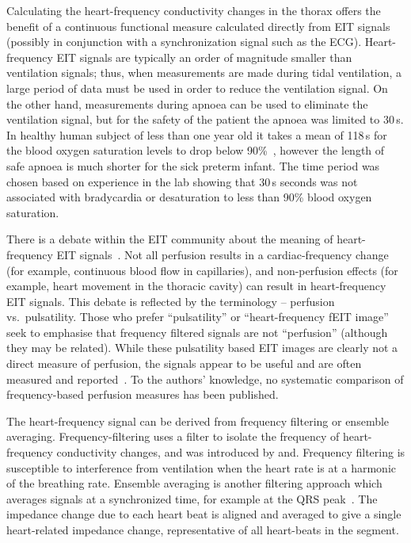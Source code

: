 Calculating the heart-frequency conductivity 
changes in the thorax offers the benefit of a continuous functional
measure calculated directly from EIT signals (possibly
in conjunction with a synchronization signal such as the ECG).
Heart-frequency EIT signals are typically an order of magnitude smaller than
ventilation signals; thus, when measurements are made during
tidal ventilation, a large period of data must be used
in order to reduce the ventilation signal. On the other hand,
measurements during apnoea can be used to eliminate the ventilation signal,
but for the safety of the patient the apnoea was limited to 30\,s.
In healthy human subject of less than one year old it 
takes a mean of 118\,s 
for the blood oxygen saturation levels to drop below
90\%~\parencite{Xue1996}, however
the length of safe apnoea is much shorter for the sick preterm infant.
The time period was chosen based on experience in the lab showing 
that 30\,s seconds was
not associated with bradycardia or desaturation to less than 90\% blood oxygen saturation.

There is a debate within the EIT community about the meaning of
heart-frequency EIT signals~\parencite{Frerichs2017, Adler2017a}. 
Not all perfusion results in a
cardiac-frequency change (for example, continuous blood flow in capillaries),
and
non-perfusion effects (for example, heart movement in the thoracic cavity)
can result in heart-frequency EIT signals.
This debate is reflected by the terminology 
-- perfusion vs.\ pulsatility.
Those who prefer ``pulsatility'' or ``heart-frequency fEIT image'' seek to emphasise that frequency
filtered signals are not ``perfusion'' (although they may be related).
While these pulsatility based EIT images are clearly not a direct measure of
perfusion, the signals appear to be useful and are often measured and 
reported~\parencite{Bartocci1999,Halter2008,Moens2014,Ericsson2016}. 
To the authors' knowledge, no systematic comparison of
frequency-based perfusion measures has been published.

The heart-frequency signal can be derived from
frequency filtering or ensemble averaging.
Frequency-filtering uses a filter to isolate the frequency of heart-frequency conductivity changes,
and was introduced by and. 
Frequency filtering is susceptible
to interference from ventilation when the heart rate is at a harmonic
of the breathing rate.
Ensemble averaging is another filtering approach which
averages signals at a synchronized time, for example at the QRS 
peak~\parencite{Bartocci1999, Deibele2008}. The impedance change due to each heart 
beat is aligned and averaged to give a single heart-related impedance change,
representative of all heart-beats in the segment.

